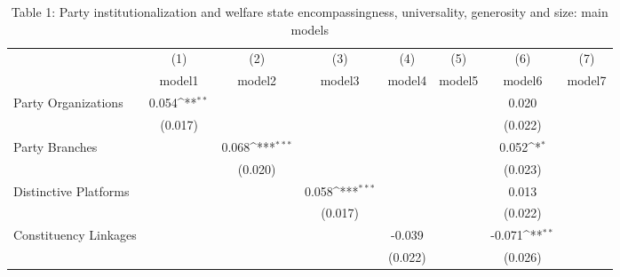 \begin{table}[htbp]\centering
\def\sym#1{\ifmmode^{#1}\else\(^{#1}\)\fi}
\caption{Table 1: Party institutionalization and welfare state encompassingness, universality, generosity and size: main models}
\begin{tabular}{l*{7}{c}}
\hline\hline
                    &\multicolumn{1}{c}{(1)}         &\multicolumn{1}{c}{(2)}         &\multicolumn{1}{c}{(3)}         &\multicolumn{1}{c}{(4)}         &\multicolumn{1}{c}{(5)}         &\multicolumn{1}{c}{(6)}         &\multicolumn{1}{c}{(7)}         \\
                    &      model1         &      model2         &      model3         &      model4         &      model5         &      model6         &      model7         \\
\hline
Party Organizations        &       0.054\sym{**} &                     &                     &                     &                     &       0.020         &                     \\
                    &     (0.017)         &                     &                     &                     &                     &     (0.022)         &                     \\
[1em]
Party Branches      &                     &       0.068\sym{***}&                     &                     &                     &       0.052\sym{*}  &                     \\
                    &                     &     (0.020)         &                     &                     &                     &     (0.023)         &                     \\
[1em]
Distinctive Platforms       &                     &                     &       0.058\sym{***}&                     &                     &       0.013         &                     \\
                    &                     &                     &     (0.017)         &                     &                     &     (0.022)         &                     \\
[1em]
Constituency Linkages      &                     &                     &                     &      -0.039         &                     &      -0.071\sym{**} &                     \\
                    &                     &                     &                     &     (0.022)         &                     &     (0.026)         &                     \\

\end{tabular}
\end{table}
